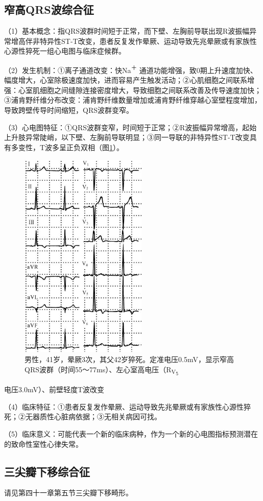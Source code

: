 \subsection{窄高QRS波综合征}

（1）基本概念：指QRS波群时间短于正常，而下壁、左胸前导联出现R波振幅异常增高伴非特异性ST-T改变，患者反复发作晕厥、运动导致先兆晕厥或有家族性心源性猝死一组心电图与临床症候群。

（2）发生机制：①离子通道改变：快Na\textsuperscript{＋}
通道功能增强，致0期上升速度加快、幅度增大，心室除极速度加快，进而容易产生触发活动；②心肌细胞之间联系增强：心室肌细胞之间缝隙连接密度增大，导致细胞之间联系改善及传导速度加快；③浦肯野纤维分布改变：浦肯野纤维数量增加或浦肯野纤维穿越心室壁程度增加，导致跨壁传导时间缩短，QRS波群变窄。

（3）心电图特征：①QRS波群变窄，时间短于正常；②R波振幅异常增高，起始上升肢异常陡峭，以下壁、左胸前导联明显；③同一导联的非特异性ST-T改变具有多变性，T波多呈正负双相（图\ref{fig40-20}）。

\begin{figure}[!htbp]
 \centering
 \includegraphics[width=2.38542in,height=3.92708in]{./images/Image00682.jpg}
 \captionsetup{justification=centering}
 \caption{男性，41岁，晕厥3次，其父42岁猝死。定准电压0.5mV，显示窄高QRS波群（时间55～77ms）、左心室高电压（R\textsubscript{V\textsubscript{5}}}
 \label{fig40-20}
  \end{figure} 
电压3.0mV）、前壁轻度T波改变

（4）临床特征：①患者反复发作晕厥、运动导致先兆晕厥或有家族性心源性猝死；②无器质性心脏病依据；③无相关病因可找。

（5）临床意义：可能代表一个新的临床病种，作为一个新的心电图指标预测潜在的致命性室性心律失常。

\protect\hypertarget{text00047.htmlux5cux23subid579}{}{}

\subsection{三尖瓣下移综合征}

请见第四十一章第五节三尖瓣下移畸形。

\protect\hypertarget{text00048.html}{}{}

\protect\hypertarget{text00048.htmlux5cux23chapter48}{}{}


